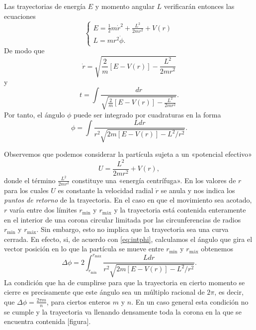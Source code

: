 \documentclass[12pt,a4paper,twocolumn,reqno]{amsart}
\theoremstyle{definition} \newtheorem{defn}[thm]{Definición}
\theoremstyle{definition} \newtheorem{ejemplo}[thm]{Ejemplo}
\theoremstyle{definition} \newtheorem{ejercicio}[thm]{Ejercicio}
\theoremstyle{remark} \newtheorem*{obs}{Observación}
\begin{document}
  Las trayectorias de energía $E$ y momento angular $L$ verificarán entonces las ecuaciones
  \begin{equation}
    \begin{cases}
    E=\tfrac{1}{2}m\dot r^2+\frac{L^2}{2mr^2}+V(r) \\
    L=mr^2\dot \phi.
  \end{cases}
  \end{equation}
  De modo que
  \begin{equation}
      \dot r=\sqrt{\frac{2}{m}[E-V(r)]-\frac{L^2}{2mr^2}} 
  \end{equation}
  y 
  \begin{equation}
    t=\int \frac{dr}{\sqrt{\frac{2}{m}[E-V(r)]-\frac{L^2}{2mr^2}}}.
  \end{equation}
  Por tanto, el ángulo $\phi$ puede ser integrado por cuadraturas en la forma
  \begin{equation}
    \phi=\int\frac{Ldr}{r^2\sqrt{2m[E-V(r)]-L^2/r^2}}. 
    \label{eq:intphi}
  \end{equation}

Observemos que podemos considerar la partícula sujeta a un «potencial efectivo»
\begin{equation}
  U=\frac{L^2}{2mr^2}+V(r),
\end{equation}
donde el término $\frac{L^2}{2mr^2}$ constituye una «energía centrífuga». En los valores de $r$ para los cuales $U$ es constante la velocidad radial $\dot r$ se anula y nos indica los \emph{puntos de retorno} de la trayectoria. En el caso en que el movimiento sea acotado, $r$ varía entre dos límites $r_{\text{min}}$ y $r_{\text{máx}}$ y la trayectoria está contenida enteramente en el interior de una corona circular limitada por las circunferencias de radios $r_{\text{min}}$ y $r_{\text{máx}}$. Sin embargo, esto no implica que la trayectoria sea una curva cerrada. En efecto, si, de acuerdo con \eqref{eq:intphi}, calculamos el ángulo que gira el vector posición en lo que la partícula se mueve entre $r_{\text{min}}$ y $r_{\text{máx}}$ obtenemos
\begin{equation}
  \Delta \phi = 2\int_{r_{\text{min}}}^{r_{\text{máx}}} \frac{Ldr}{r^2\sqrt{2m[E-V(r)]-L^2/r^2}}.
\end{equation}
La condición que ha de cumplirse para que la trayectoria en cierto momento se cierre es precisamente que este ángulo sea un múltiplo racional de $2\pi$, es decir, que $\Delta \phi = \frac{2\pi m}{n}$, para ciertos enteros $m$ y $n$. En un caso general esta condición no se cumple y la trayectoria va llenando densamente toda la corona en la que se encuentra contenida [figura].
\end{document}
